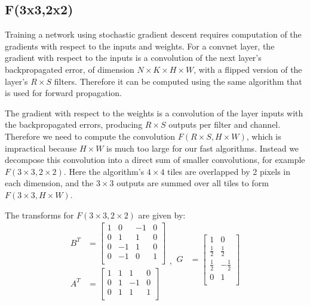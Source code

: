 \documentclass[10pt,twocolumn,letterpaper]{article}
\begin{document}
\subsection{F(3x3,2x2)}

Training a network using stochastic gradient descent requires computation of the gradients with respect to the inputs and weights. For a convnet layer, the gradient with respect to the inputs is a convolution of the next layer's backpropagated error, of dimension $N \times K \times H \times W$, with a flipped version of the layer's $R \times S$ filters. Therefore it can be computed using the same algorithm that is used for forward propagation.

The gradient with respect to the weights is a convolution of the layer inputs with the backpropagated errors, producing $R \times S$ outputs per filter and channel. Therefore we need to compute the convolution $F(R \times S,H\times W)$, which is impractical because $H \times W$ is much too large for our fast algorithms. Instead we decompose this convolution into a direct sum of smaller convolutions, for example  $F(3 \times 3, 2 \times 2)$. Here the algorithm's $4 \times 4$ tiles  are overlapped by 2 pixels in each dimension, and the $3 \times 3$ outputs are summed over all tiles to form $F(3 \times 3, H \times W)$.

The transforms for $F(3 \times 3, 2 \times 2)$ are given by:
\begin{equation}\label{eq:F_3_2_matrices}
\begin{split}
B^T &= \left[
\begin{array}{rrrr}
 1 & 0 & -1 & 0 \\
 0 & 1 & 1 & 0 \\
 0 & -1 & 1 & 0 \\
 0 & -1 & 0 & 1 \\
\end{array}
\right] \\
A^T &= \left[
\begin{array}{rrrr}
 1 & 1 & 1 & 0 \\
 0 & 1 & -1 & 0 \\
 0 & 1 & 1 & 1 \\
\end{array}
\right]
\end{split},
\begin{split}
G &= \left[
\begin{array}{rr}
 1 & 0 \\
 \frac{1}{2} & \frac{1}{2} \\
 \frac{1}{2} & -\frac{1}{2} \\
 0 & 1 \\
\end{array}
\right] \\
\end{split}
\end{equation}
\end{document}

